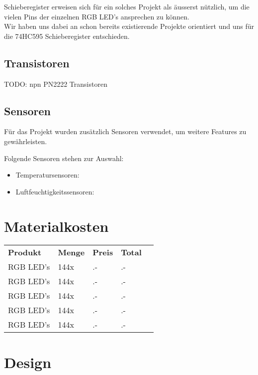 \documentclass[12pt,a4paper]{article}
\begin{document}
Schieberegister erweisen sich für ein solches Projekt als äusserst nützlich, um die vielen Pins der einzelnen RGB LED's ansprechen zu können. \\

Wir haben uns dabei an schon bereits existierende Projekte orientiert und uns für die 74HC595 Schieberegister entschieden.

\subsection{Transistoren}

TODO: npn PN2222 Transistoren

\subsection{Sensoren}

Für das Projekt wurden zusätzlich Sensoren verwendet, um weitere Features zu gewährleisten.

Folgende Sensoren stehen zur Auswahl:
\begin{itemize}
    \item Temperatursensoren:
    \item Luftfeuchtigkeitssensoren:
\end{itemize}

\section{Materialkosten}

\begin{tabularx}{\textwidth}{p{} | l | l | l | r |}
    \textbf{Produkt} & \textbf{Menge} & \textbf{Preis} & \textbf{Total} \\
    \cline{1-4}
    RGB LED's & 144x & .- & .- \\
    \cline{1-4}
    RGB LED's & 144x & .- & .- \\
    \cline{1-4}
    RGB LED's & 144x & .- & .- \\
    \cline{1-4}
    RGB LED's & 144x & .- & .- \\
    \cline{1-4}
    RGB LED's & 144x & .- & .- \\
    
\end{tabularx}

\section{Design}
\end{document}
